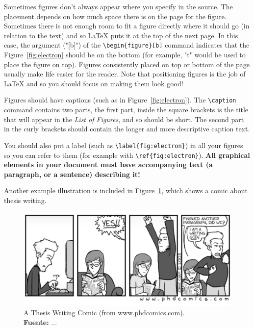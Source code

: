 Sometimes figures don't always appear where you specify in the source. The placement depends on how much space there is on the page for the figure. Sometimes there is not enough room to fit a figure directly where it should go (in relation to the text) and so \LaTeX{} puts it at the top of the next page. In this case, the argument ("[b]") of the \verb|\begin{figure}[b]| command indicates that the Figure~\ref{fig:electron} should be on the bottom (for example, "t" would be used to place the figure on top). Figures consistently placed on top or bottom of the page usually make life easier for the reader. Note that positioning figures is the job of \LaTeX{} and so you should focus on making them look good! 

Figures should have captions (such as in Figure~\ref{fig:electron}). The \verb|\caption| command contains two parts, the first part, inside the square brackets is the title that will appear in the \emph{List of Figures}, and so should be short. The second part in the curly brackets should contain the longer and more descriptive caption text. 

You should also put a label (such as \verb|\label{fig:electron}|) in all your figures so you can refer to them (for example with \verb|\ref{fig:electron}|). {\bf All graphical elements in your document must have accompanying text (a paragraph, or a sentence) describing it!}

Another example illustration is included in Figure~\ref{fig:comic}, which shows a comic about thesis writing.

\begin{figure}[t]
\centering
\includegraphics[width=\textwidth,keepaspectratio]{ch2/assets/comic}
\caption[Thesis Writing Comic]{A Thesis Writing Comic (from www.phdcomics.com).\\ {\bfseries Fuente:} ...}
\label{fig:comic}
\end{figure}

